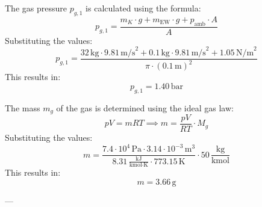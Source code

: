 The gas pressure \( p_{g,1} \) is calculated using the formula:  
\[
p_{g,1} = \frac{m_K \cdot g + m_{\text{EW}} \cdot g + p_{\text{amb}} \cdot A}{A}
\]  
Substituting the values:  
\[
p_{g,1} = \frac{32 \, \text{kg} \cdot 9.81 \, \text{m/s}^2 + 0.1 \, \text{kg} \cdot 9.81 \, \text{m/s}^2 + 1.05 \, \text{N/m}^2}{\pi \cdot (0.1 \, \text{m})^2}
\]  
This results in:  
\[
p_{g,1} = 1.40 \, \text{bar}
\]  

The mass \( m_g \) of the gas is determined using the ideal gas law:  
\[
pV = mRT \implies m = \frac{pV}{RT} \cdot M_g
\]  
Substituting the values:  
\[
m = \frac{7.4 \cdot 10^4 \, \text{Pa} \cdot 3.14 \cdot 10^{-3} \, \text{m}^3}{8.31 \, \frac{\text{kJ}}{\text{kmol·K}} \cdot 773.15 \, \text{K}} \cdot 50 \, \frac{\text{kg}}{\text{kmol}}
\]  
This results in:  
\[
m = 3.66 \, \text{g}
\]  

---